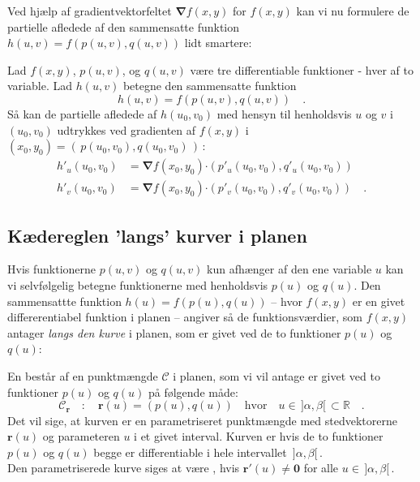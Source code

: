 Ved hjælp af gradientvektorfeltet ${\bm{\nabla}}f(x,y)$ for $f(x,y)$ kan vi nu formulere de partielle afledede af den sammensatte funktion
$h(u,v) = f(p(u,v), q(u,v))$ lidt smartere:

\begin{theorem} \label{thmChain2VarB}
Lad $f(x,y)$, $p(u,v)$, og $q(u,v)$ være tre differentiable funktioner - hver af to variable.
Lad $h(u,v)$ betegne den sammensatte funktion
\begin{equation}
h(u,v) = f(p(u,v), q(u,v)) \quad .
 \end{equation}
Så kan de partielle afledede af $h(u_{0},v_{0})$ med hensyn til henholdsvis $u$ og $v$ i $(u_{0},v_{0})$ udtrykkes ved gradienten af $f(x,y)$ i $(x_{0}, y_{0}) = (\,p(u_{0},v_{0}), q(u_{0},v_{0})\,)\,$:
\begin{equation} \label{eqGeneralChain}
\begin{aligned}
h'_{u}(u_{0},v_{0}) &= {\bm{\nabla}}f(x_{0}, y_{0}) \bm{\cdot} \left(p'_{u}(u_{0},v_{0}), q'_{u}(u_{0},v_{0}) \right) \\
h'_{v}(u_{0},v_{0}) &= {\bm{\nabla}}f(x_{0}, y_{0}) \bm{\cdot} \left(p'_{v}(u_{0},v_{0}), q'_{v}(u_{0},v_{0}) \right) \quad .
\end{aligned}
\end{equation}
\end{theorem}


\subsection{Kædereglen 'langs' kurver i planen}
Hvis funktionerne $p(u,v)$ og $q(u,v)$ kun afhænger af den ene variable $u$ kan vi selvfølgelig betegne funktionerne med henholdsvis  $p(u)$ og $q(u)$.
Den sammensattte funktion $h(u) = f(p(u), q(u))$ -- hvor $f(x,y)$ er en givet differerentiabel funktion i planen -- angiver så de funktionsværdier, som $f(x,y)$ antager \emph{langs den kurve} i planen, som er givet ved de to funktioner $p(u)$ og $q(u)$:

\begin{definition}
En  består af en punktmængde $\mathcal{C}$ i planen, som vi vil antage er givet ved to funktioner $p(u)$ og $q(u)$ på følgende måde:
\begin{equation}
\mathcal{C}_{\mathbf{r}}\quad : \quad \mathbf{r}(u) = (p(u), q(u)) \quad \textrm{hvor} \quad u \in \, ]\alpha, \beta[ \, \subset \mathbb{R} \quad .
\end{equation}
Det vil sige, at kurven er en parametriseret punktmængde med stedvektorerne $\mathbf{r}(u)$ og parameteren $u$ i et givet interval.
Kurven er  hvis de to funktioner $p(u)$ og $q(u)$ begge er differentiable i hele intervallet $\,]\alpha, \beta[ \,$.\\

Den parametriserede kurve siges at være , hvis $\mathbf{r}'(u) \neq \mathbf{0}$ for alle $u \in \, ]\alpha, \beta[\,$.
\end{definition}


